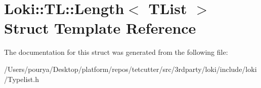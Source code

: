 \hypertarget{structLoki_1_1TL_1_1Length}{}\section{Loki\+:\+:T\+L\+:\+:Length$<$ T\+List $>$ Struct Template Reference}
\label{structLoki_1_1TL_1_1Length}


The documentation for this struct was generated from the following file\+:\begin{DoxyCompactItemize}
\item 
/\+Users/pourya/\+Desktop/platform/repos/tetcutter/src/3rdparty/loki/include/loki/Typelist.\+h\end{DoxyCompactItemize}
